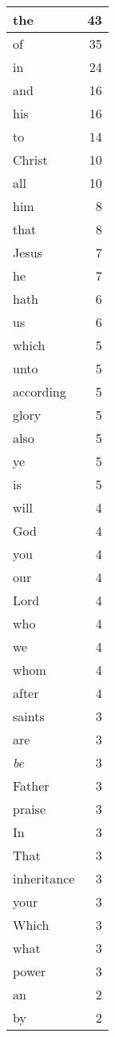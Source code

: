 \begin{center}
\begin{longtable}{l|r}
the & 43\\ \hline 
of & 35\\ \hline 
in & 24\\ \hline 
and & 16\\ \hline 
his & 16\\ \hline 
to & 14\\ \hline 
Christ & 10\\ \hline 
all & 10\\ \hline 
him & 8\\ \hline 
that & 8\\ \hline 
Jesus & 7\\ \hline 
he & 7\\ \hline 
hath & 6\\ \hline 
us & 6\\ \hline 
which & 5\\ \hline 
unto & 5\\ \hline 
according & 5\\ \hline 
glory & 5\\ \hline 
also & 5\\ \hline 
ye & 5\\ \hline 
is & 5\\ \hline 
will & 4\\ \hline 
God & 4\\ \hline 
you & 4\\ \hline 
our & 4\\ \hline 
Lord & 4\\ \hline 
who & 4\\ \hline 
we & 4\\ \hline 
whom & 4\\ \hline 
after & 4\\ \hline 
saints & 3\\ \hline 
are & 3\\ \hline 
\emph{be} & 3\\ \hline 
Father & 3\\ \hline 
praise & 3\\ \hline 
In & 3\\ \hline 
That & 3\\ \hline 
inheritance & 3\\ \hline 
your & 3\\ \hline 
Which & 3\\ \hline 
what & 3\\ \hline 
power & 3\\ \hline 
an & 2\\ \hline 
by & 2\\ \hline 

\end{longtable}
\end{center}
